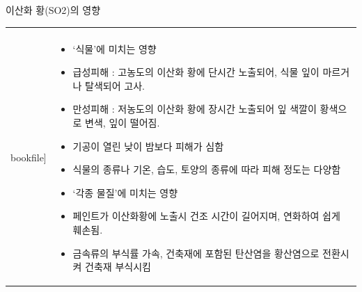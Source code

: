 \begin{frame}[t]{이산화 황(SO2)의 영향}
	\begin{tabular}{ll}
		\begin{minipage}[t]{0.3\textwidth}\scriptsize
			\begin{figure}[t]
				\texttt{[image: \\bookfile]}
			\end{figure}
		\end{minipage}	
		&
		\begin{minipage}[t]{0.65\textwidth} \scriptsize	
			\begin{itemize}
				\item ‘식물’에 미치는 영향
				\item 급성피해 : 고농도의 이산화 황에 단시간 노출되어, 식물 잎이 마르거나 탈색되어 고사.
				\item 만성피해 : 저농도의 이산화 황에 장시간 노출되어 잎 색깔이 황색으로 변색, 잎이 떨어짐.
				\item 기공이 열린 낮이 밤보다 피해가 심함
				\item 식물의 종류나 기온, 습도, 토양의 종류에 따라 피해 정도는 다양함
				
				\item ‘각종 물질’에 미치는 영향
				\item 페인트가 이산화황에 노출시 건조 시간이 길어지며, 연화하여 쉽게 훼손됨.
				\item 금속류의 부식률 가속, 건축재에 포함된 탄산염을 황산염으로 전환시켜 건축재 부식시킴
				
			\end{itemize}

		\end{minipage}
	\end{tabular}
\end{frame}



